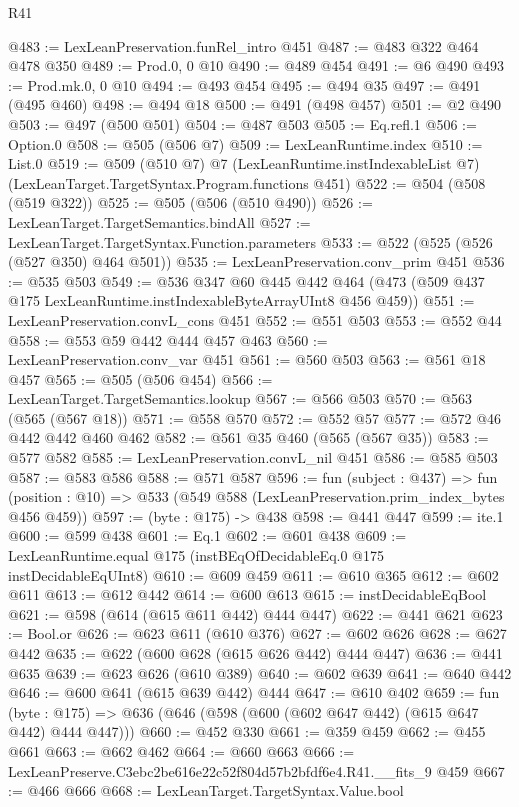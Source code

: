 \begin{lexlean}{R41}
\begin{coremodule}
@483 := LexLeanPreservation.funRel_intro @451
@487 := @483 @322 @464 @478 @350
@489 := Prod.{0, 0} @10
@490 := @489 @454
@491 := @6 @490
@493 := Prod.mk.{0, 0} @10
@494 := @493 @454
@495 := @494 @35
@497 := @491 (@495 @460)
@498 := @494 @18
@500 := @491 (@498 @457)
@501 := @2 @490
@503 := @497 (@500 @501)
@504 := @487 @503
@505 := Eq.refl.{1}
@506 := Option.{0}
@508 := @505 (@506 @7)
@509 := LexLeanRuntime.index
@510 := List.{0}
@519 := @509
    (@510 @7)
    @7
    (LexLeanRuntime.instIndexableList @7)
    (LexLeanTarget.TargetSyntax.Program.functions @451)
@522 := @504 (@508 (@519 @322))
@525 := @505 (@506 (@510 @490))
@526 := LexLeanTarget.TargetSemantics.bindAll
@527 := LexLeanTarget.TargetSyntax.Function.parameters
@533 := @522 (@525 (@526 (@527 @350) @464 @501))
@535 := LexLeanPreservation.conv_prim @451
@536 := @535 @503
@549 := @536
    @347
    @60
    @445
    @442
    @464
    (@473 (@509 @437 @175 LexLeanRuntime.instIndexableByteArrayUInt8 @456 @459))
@551 := LexLeanPreservation.convL_cons @451
@552 := @551 @503
@553 := @552 @44
@558 := @553 @59 @442 @444 @457 @463
@560 := LexLeanPreservation.conv_var @451
@561 := @560 @503
@563 := @561 @18 @457
@565 := @505 (@506 @454)
@566 := LexLeanTarget.TargetSemantics.lookup
@567 := @566 @503
@570 := @563 (@565 (@567 @18))
@571 := @558 @570
@572 := @552 @57
@577 := @572 @46 @442 @442 @460 @462
@582 := @561 @35 @460 (@565 (@567 @35))
@583 := @577 @582
@585 := LexLeanPreservation.convL_nil @451
@586 := @585 @503
@587 := @583 @586
@588 := @571 @587
@596 := fun (subject : @437) =>
  fun (position : @10) => @533 (@549 @588 (LexLeanPreservation.prim_index_bytes @456 @459))
@597 := (byte : @175) -> @438
@598 := @441 @447
@599 := ite.{1}
@600 := @599 @438
@601 := Eq.{1}
@602 := @601 @438
@609 := LexLeanRuntime.equal @175 (instBEqOfDecidableEq.{0} @175 instDecidableEqUInt8)
@610 := @609 @459
@611 := @610 @365
@612 := @602 @611
@613 := @612 @442
@614 := @600 @613
@615 := instDecidableEqBool
@621 := @598 (@614 (@615 @611 @442) @444 @447)
@622 := @441 @621
@623 := Bool.or
@626 := @623 @611 (@610 @376)
@627 := @602 @626
@628 := @627 @442
@635 := @622 (@600 @628 (@615 @626 @442) @444 @447)
@636 := @441 @635
@639 := @623 @626 (@610 @389)
@640 := @602 @639
@641 := @640 @442
@646 := @600 @641 (@615 @639 @442) @444
@647 := @610 @402
@659 := fun (byte : @175) => @636 (@646 (@598 (@600 (@602 @647 @442) (@615 @647 @442) @444 @447)))
@660 := @452 @330
@661 := @359 @459
@662 := @455 @661
@663 := @662 @462
@664 := @660 @663
@666 := LexLeanPreserve.C3ebc2be616e22c52f804d57b2bfdf6e4.R41.__fits_9 @459
@667 := @466 @666
@668 := LexLeanTarget.TargetSyntax.Value.bool

\end{coremodule}
\end{lexlean}
